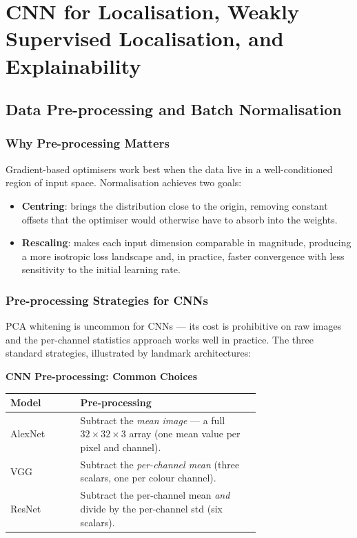 \documentclass[11pt,a4paper]{article}
\begin{document}
\section{CNN for Localisation, Weakly Supervised Localisation, and Explainability}
\label{sec:lecture10}

\subsection{Data Pre-processing and Batch Normalisation}

\subsubsection{Why Pre-processing Matters}

Gradient-based optimisers work best when the data live in a well-conditioned region of input space. Normalisation achieves two goals:
\begin{itemize}
  \item \textbf{Centring}: brings the distribution close to the origin, removing constant offsets that the optimiser would otherwise have to absorb into the weights.
  \item \textbf{Rescaling}: makes each input dimension comparable in magnitude, producing a more isotropic loss landscape and, in practice, faster convergence with less sensitivity to the initial learning rate.
\end{itemize}

\subsubsection{Pre-processing Strategies for CNNs}

PCA whitening is uncommon for CNNs — its cost is prohibitive on raw images and the per-channel statistics approach works well in practice. The three standard strategies, illustrated by landmark architectures:

\begin{tcolorbox}[colback=LightBlue,colframe=AccentBlue,boxrule=0.8pt,arc=3pt]
\textbf{CNN Pre-processing: Common Choices}\\[4pt]
\begin{tabular}{@{}lp{0.72\linewidth}@{}}
\toprule
\textbf{Model} & \textbf{Pre-processing} \\
\midrule
AlexNet & Subtract the \emph{mean image} — a full $32\times32\times3$ array (one mean value per pixel and channel). \\
VGG     & Subtract the \emph{per-channel mean} (three scalars, one per colour channel). \\
ResNet  & Subtract the per-channel mean \emph{and} divide by the per-channel std (six scalars). \\
\bottomrule
\end{tabular}
\end{tcolorbox}
\end{document}
